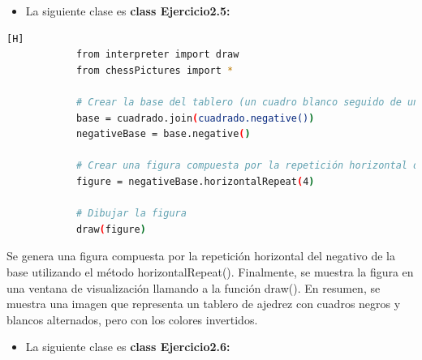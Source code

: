 \documentclass{article}
\begin{document}
\begin{itemize}	
		\item La siguiente clase es \textbf{class Ejercicio2.5:} 
	\end{itemize}
 
	\begin{lstlisting}[language=bash,caption={\textbf{QUINTO EJERCICIO}}][H]
            from interpreter import draw
            from chessPictures import *
            
            # Crear la base del tablero (un cuadro blanco seguido de un cuadro negro)
            base = cuadrado.join(cuadrado.negative())
            negativeBase = base.negative()
            
            # Crear una figura compuesta por la repetición horizontal del negativo de la base
            figure = negativeBase.horizontalRepeat(4)
            
            # Dibujar la figura
            draw(figure)
	\end{lstlisting}
Se genera una figura compuesta por la repetición horizontal del negativo de la base utilizando el método horizontalRepeat(). Finalmente, se muestra la figura en una ventana de visualización llamando a la función draw(). En resumen, se muestra una imagen que representa un tablero de ajedrez con cuadros negros y blancos alternados, pero con los colores invertidos.

\begin{itemize}	
		\item La siguiente clase es \textbf{class Ejercicio2.6:} 
	\end{itemize}
 
\end{document}
